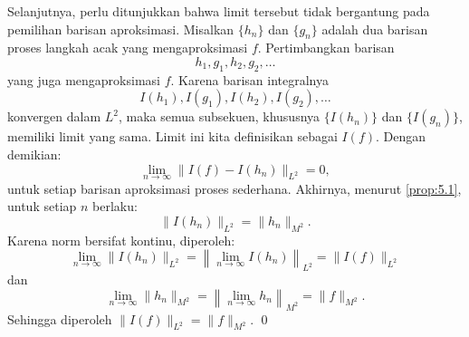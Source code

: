 \documentclass[aspectratio=169,11pt]{beamer}
\theoremstyle{definition}
\newcommand{\myref}[1]{\hyperref[#1]{\nameCref{#1} \ref*{#1}}}
\begin{document}
\begin{frame}[allowframebreaks]{\insertsection}{\insertsubsection}
  Selanjutnya, perlu ditunjukkan bahwa limit tersebut tidak bergantung pada pemilihan barisan aproksimasi. Misalkan $\{h_n\}$ dan $\{g_n\}$ adalah dua barisan proses langkah acak yang mengaproksimasi $f$. Pertimbangkan barisan
  \begin{equation*}
    h_1, g_1, h_2, g_2, \dots
  \end{equation*}
  yang juga mengaproksimasi $f$. Karena barisan integralnya
  \begin{equation*}
    I(h_1), I(g_1), I(h_2), I(g_2), \dots
  \end{equation*}
  konvergen dalam $L^2$, maka semua subsekuen, khususnya $\{I(h_n)\}$ dan $\{I(g_n)\}$, memiliki limit yang sama. Limit ini kita definisikan sebagai $I(f)$. Dengan demikian:
  \begin{equation*}
    \lim_{n \to \infty} \|I(f) - I(h_n)\|_{L^2} = 0,
  \end{equation*}
  untuk setiap barisan aproksimasi proses sederhana.
  Akhirnya, menurut \myref{prop:5.1}, untuk setiap $n$ berlaku:
  \begin{equation*}
    \|I(h_n)\|_{L^2} = \|h_n\|_{M^2}.
  \end{equation*}
  Karena norm bersifat kontinu, diperoleh:
  \begin{equation*}
    \lim_{n \to \infty} \|I(h_n)\|_{L^2} = \left\| \lim_{n \to \infty} I(h_n) \right\|_{L^2} = \|I(f)\|_{L^2}
  \end{equation*}
  dan
  \begin{equation*}
    \lim_{n \to \infty} \|h_n\|_{M^2} = \left\| \lim_{n \to \infty} h_n \right\|_{M^2} = \|f\|_{M^2}.
  \end{equation*}
  Sehingga diperoleh $\|I(f)\|_{L^2} = \|f\|_{M^2}$. \qed
\end{frame}
\end{document}
